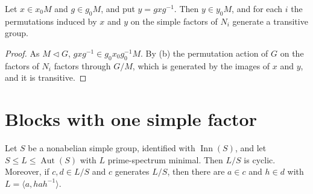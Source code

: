 \documentclass[11pt,colorlinks]{charlie}
\DeclareMathOperator{\Aut}{Aut}
\DeclareMathOperator{\Inn}{Inn}
\newcommand{\gen}[1]{\langle #1\rangle}
\begin{document}
\begin{lemma}\label{lem:transitive}
Let $x\in x_0M$ and $g\in g_0M$, and put $y=gxg^{-1}$. Then $y\in y_0M$, and for each $i$ the permutations induced by $x$ and $y$ on the simple factors of $N_i$ generate a transitive group.
\end{lemma}

\begin{proof}
As $M\lhd G$, $gxg^{-1}\in g_0x_0g_0^{-1}M$. By (b) the permutation action of $G$ on the factors of $N_i$ factors through $G/M$, which is generated by the images of $x$ and $y$, and it is transitive.
\end{proof}

\section{Blocks with one simple factor}\label{sec:almostsimple}

\begin{proposition}\label{prop:almostsimple}
Let $S$ be a nonabelian simple group, identified with $\Inn(S)$, and let $S\le L\le\Aut(S)$ with $L$ prime-spectrum minimal. Then $L/S$ is cyclic. Moreover, if $c,d\in L/S$ and $c$ generates $L/S$, then there are $a\in c$ and $h\in d$ with $L=\gen{a,hah^{-1}}$.
\end{proposition}
\end{document}
